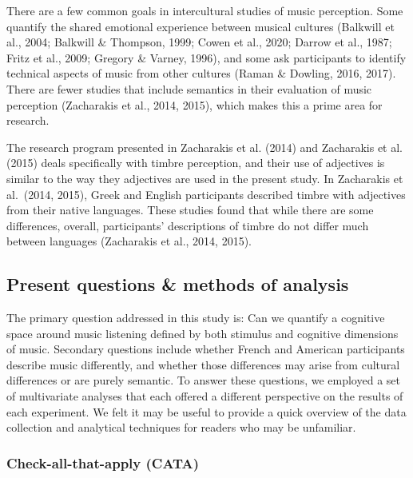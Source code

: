 \documentclass[
  english,
  man,floatsintext]{apa6}
\begin{document}
There are a few common goals in intercultural studies of music perception. Some quantify the shared emotional experience between musical cultures (Balkwill et al., 2004; Balkwill \& Thompson, 1999; Cowen et al., 2020; Darrow et al., 1987; Fritz et al., 2009; Gregory \& Varney, 1996), and some ask participants to identify technical aspects of music from other cultures (Raman \& Dowling, 2016, 2017). There are fewer studies that include semantics in their evaluation of music perception (Zacharakis et al., 2014, 2015), which makes this a prime area for research.

The research program presented in Zacharakis et al. (2014) and Zacharakis et al. (2015) deals specifically with timbre perception, and their use of adjectives is similar to the way they adjectives are used in the present study. In Zacharakis et al.~(2014, 2015), Greek and English participants described timbre with adjectives from their native languages. These studies found that while there are some differences, overall, participants' descriptions of timbre do not differ much between languages (Zacharakis et al., 2014, 2015).

\hypertarget{present-questions-methods-of-analysis}{%
\subsection{Present questions \& methods of analysis}\label{present-questions-methods-of-analysis}}

The primary question addressed in this study is: Can we quantify a cognitive space around music listening defined by both stimulus and cognitive dimensions of music. Secondary questions include whether French and American participants describe music differently, and whether those differences may arise from cultural differences or are purely semantic. To answer these questions, we employed a set of multivariate analyses that each offered a different perspective on the results of each experiment. We felt it may be useful to provide a quick overview of the data collection and analytical techniques for readers who may be unfamiliar.

\hypertarget{check-all-that-apply-cata}{%
\subsubsection{Check-all-that-apply (CATA)}\label{check-all-that-apply-cata}}
\end{document}

